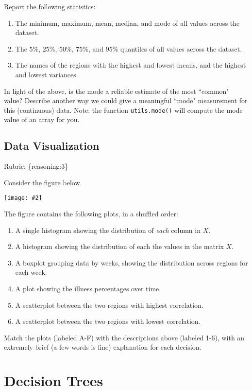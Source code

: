 \documentclass{article}
\def\rubric#1{\gre{Rubric: \{#1\}}}{}
\def\blu#1{{\color{blu}#1}}
\def\gre#1{{\color{gre}#1}}
\newcommand{\fig}[2]{\texttt{[image: \#2]}}
\def\enum#1{\begin{enumerate}#1\end{enumerate}}
\begin{document}
\blu{Report the following statistics}:
\enum{
\item The minimum, maximum, mean, median, and mode of all values across the dataset.
\item The $5\%$, $25\%$, $50\%$, $75\%$, and $95\%$ quantiles of all values across the dataset.
\item The names of the regions with the highest and lowest means, and the highest and lowest variances.
}
In light of the above, \blu{is the mode a reliable estimate of the most ``common" value? Describe another way we could give a meaningful ``mode" measurement for this (continuous) data.} Note: the function \texttt{utils.mode()} will compute the mode value of an array for you.



\subsection{Data Visualization}
\rubric{reasoning:3}

Consider the figure below.

\fig{1}{../figs/visualize-unlabeled}

The figure contains the following plots, in a shuffled order:
\enum{
\item A single histogram showing the distribution of \emph{each} column in $X$.
\item A histogram showing the distribution of each the values in the matrix $X$.
\item A boxplot grouping data by weeks, showing the distribution across regions for each week.
\item A plot showing the illness percentages over time.
\item A scatterplot between the two regions with highest correlation.
\item A scatterplot between the two regions with lowest correlation.
}

\blu{Match the plots (labeled A-F) with the descriptions above (labeled 1-6), with an extremely brief (a few words is fine) explanation for each decision.}



\section{Decision Trees}
\end{document}
